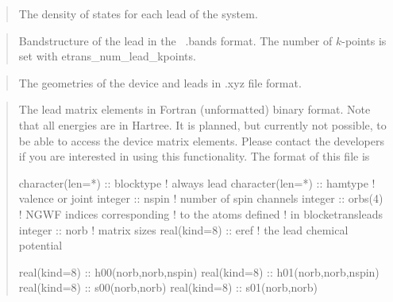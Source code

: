 \documentclass[letterpaper,10pt,english]{sphinxmanual}
\begin{document}
\begin{quote}

\begin{DUlineblock}{0em}
\item[] The density of states for each lead of the system.
\end{DUlineblock}
\end{quote}

\begin{quote}

\begin{DUlineblock}{0em}
\item[] Bandstructure of the lead in the  .bands format. The number of
\(k\)-points is set with etrans\_num\_lead\_kpoints.
\end{DUlineblock}
\end{quote}

   
\begin{quote}

\begin{DUlineblock}{0em}
\item[] The geometries of the device and leads in .xyz file format.
\end{DUlineblock}
\end{quote}

\begin{quote}

\begin{DUlineblock}{0em}
\item[] The lead matrix elements in Fortran (unformatted) binary format.
Note that all energies are in Hartree. It is planned, but
currently not possible, to be able to access the device matrix
elements. Please contact the developers if you are interested in
using this functionality. The format of this file is
\end{DUlineblock}

%
\begin{sphinxVerbatim}[commandchars=\\\{\}]
character(len=*) :: block\PYGZus{}type  ! always lead
character(len=*) :: ham\PYGZus{}type    ! valence or joint
integer          :: nspin       ! number of spin channels
integer          :: orbs(4)     ! NGWF indices corresponding
                                ! to the atoms defined
                                ! in block\PYGZus{}etrans\PYGZus{}leads
integer          :: norb        ! matrix sizes
real(kind=8)     :: eref        ! the lead chemical potential

real(kind=8)   :: h00(norb,norb,nspin)
real(kind=8)   :: h01(norb,norb,nspin)
real(kind=8)   :: s00(norb,norb)
real(kind=8)   :: s01(norb,norb)
\end{sphinxVerbatim}
\end{quote}
\end{document}
